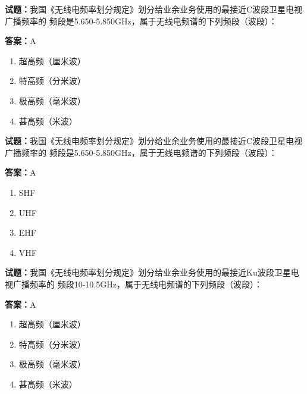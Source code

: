 \documentclass{ctexbook}
\begin{document}
\textbf{试题：}我国《无线电频率划分规定》划分给业余业务使用的最接近C波段卫星电视广播频率的
频段是5.650-5.850GHz，属于无线电频谱的下列频段（波段）： 

\textbf{答案：}A 

\begin{enumerate}[leftmargin=3em]
  \item 超高频（厘米波） 

  \item 特高频（分米波） 

  \item 极高频（毫米波） 

  \item 甚高频（米波） 

\end{enumerate}





\vspace{1em}

\textbf{试题：}我国《无线电频率划分规定》划分给业余业务使用的最接近C波段卫星电视广播频率的
频段是5.650-5.850GHz，属于无线电频谱的下列频段（波段）： 

\textbf{答案：}A 

\begin{enumerate}[leftmargin=3em]
  \item SHF 

  \item UHF 

  \item EHF 

  \item VHF 

\end{enumerate}





\vspace{1em}

\textbf{试题：}我国《无线电频率划分规定》划分给业余业务使用的最接近Ku波段卫星电视广播频率的
频段10-10.5GHz，属于无线电频谱的下列频段（波段）： 


\textbf{答案：}A 

\begin{enumerate}[leftmargin=3em]
  \item 超高频（厘米波） 

  \item 特高频（分米波） 

  \item 极高频（毫米波） 

  \item 甚高频（米波） 

\end{enumerate}
\end{document}

